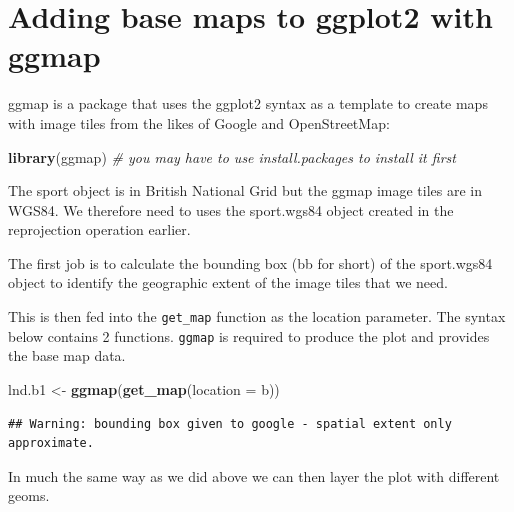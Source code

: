 \documentclass[]{article}
\newenvironment{Shaded}{}{}
\newcommand{\KeywordTok}[1]{\textcolor[rgb]{0.00,0.44,0.13}{\textbf{{#1}}}}
\newcommand{\DataTypeTok}[1]{\textcolor[rgb]{0.56,0.13,0.00}{{#1}}}
\newcommand{\DecValTok}[1]{\textcolor[rgb]{0.25,0.63,0.44}{{#1}}}
\newcommand{\FloatTok}[1]{\textcolor[rgb]{0.25,0.63,0.44}{{#1}}}
\newcommand{\CommentTok}[1]{\textcolor[rgb]{0.38,0.63,0.69}{\textit{{#1}}}}
\newcommand{\NormalTok}[1]{{#1}}
\begin{document}
\section{Adding base maps to ggplot2 with ggmap}

ggmap is a package that uses the ggplot2 syntax as a template to create
maps with image tiles from the likes of Google and OpenStreetMap:

\begin{Shaded}
\begin{Highlighting}[]
\KeywordTok{library}\NormalTok{(ggmap)  }\CommentTok{# you may have to use install.packages to install it first}
\end{Highlighting}
\end{Shaded}
The sport object is in British National Grid but the ggmap image tiles
are in WGS84. We therefore need to uses the sport.wgs84 object created
in the reprojection operation earlier.

The first job is to calculate the bounding box (bb for short) of the
sport.wgs84 object to identify the geographic extent of the image tiles
that we need.

\begin{Shaded}
\end{Shaded}
This is then fed into the \texttt{get\_map} function as the location
parameter. The syntax below contains 2 functions. \texttt{ggmap} is
required to produce the plot and provides the base map data.

\begin{Shaded}
\begin{Highlighting}[]
\NormalTok{lnd.b1 <- }\KeywordTok{ggmap}\NormalTok{(}\KeywordTok{get_map}\NormalTok{(}\DataTypeTok{location =} \NormalTok{b))}
\end{Highlighting}
\end{Shaded}
\begin{verbatim}
## Warning: bounding box given to google - spatial extent only approximate.
\end{verbatim}
In much the same way as we did above we can then layer the plot with
different geoms.
\end{document}
